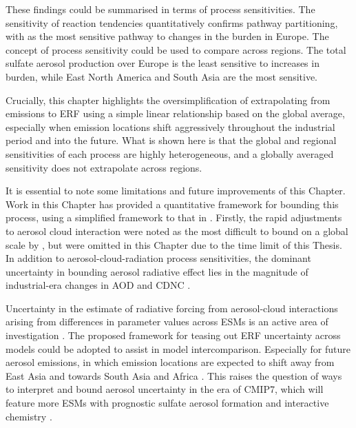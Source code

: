 These findings could be summarised in terms of process sensitivities. The sensitivity of reaction tendencies quantitatively confirms pathway partitioning, with  as the most sensitive pathway to changes in the  burden in Europe. The concept of process sensitivity could be used to compare across regions. The total sulfate aerosol production over Europe is the least sensitive to increases in  burden, while East North America and South Asia are the most sensitive.


Crucially, this chapter highlights the oversimplification of extrapolating from  emissions to ERF using a simple linear relationship based on the global average, especially when emission locations shift aggressively throughout the industrial period and into the future. What is shown here is that the global and regional sensitivities of each process are highly heterogeneous, and a globally averaged sensitivity does not extrapolate across regions. 


It is essential to note some limitations and future improvements of this Chapter. Work in this Chapter has provided a quantitative framework for bounding this process, using a simplified framework to that in \citet{bellouinBoundingGlobalAerosol2020}.  Firstly, the rapid adjustments to aerosol cloud interaction were noted as the most difficult to bound on a global scale by \citet{bellouinBoundingGlobalAerosol2020}, but were omitted in this Chapter due to the time limit of this Thesis. In addition to aerosol-cloud-radiation process sensitivities, the dominant uncertainty in bounding aerosol radiative effect lies in the magnitude of industrial-era changes in AOD and CDNC \citep{bellouinBoundingGlobalAerosol2020}. 


Uncertainty in the estimate of radiative forcing from aerosol-cloud interactions arising from differences in parameter values across ESMs is an active area of investigation \citep[e.g.][]{ghanChallengesConstrainingAnthropogenic2016,bellouinBoundingGlobalAerosol2020}. The proposed framework for teasing out ERF uncertainty across models could be adopted to assist in model intercomparison. Especially for future aerosol emissions, in which emission locations are expected to shift away from East Asia and towards South Asia and Africa \citep{wilcoxRegionalAerosolModel2022}. This raises the question of ways to interpret and bound aerosol uncertainty in the era of CMIP7, which will feature more ESMs with prognostic sulfate aerosol formation and interactive chemistry \citep{dunneEvolvingCoupledModel2024,fiedlerAerChemMIP2NdashUnraveling2025}. 

